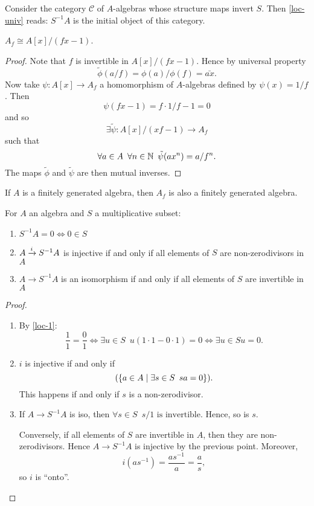 \begin{corollary}
  Consider the category $\mathcal C$ of $A$-algebras whose structure maps invert $S$. Then \cref{loc-univ} reads: $S^{-1}A$ is the initial object of this category.
\end{corollary}

\begin{lemma}
  \label{loc-1}
  $A_f \cong A[x] / {(fx-1)}$.
\end{lemma}

\begin{proof}
  Note that $f$ is invertible in $A[x] / {(fx-1)}$.
  Hence by universal property
  \[\tilde{\phi}(a / f) = \phi(a) / \phi(f) = \bar{ax}. \]
  Now take
  $\psi \colon A[x] \to A_f$ a homomorphism of $A$-algebras defined by $\psi(x) = 1 / f$.
  Then
  \[ \psi(fx - 1) = f \cdot 1 / f - 1 = 0 \]
  and so
  \[ \exists \tilde \psi \colon A[x] /{(xf-1)} \to A_f \]
  such that
  \[ \forall a \in A \enspace \forall n \in \mathbb N \enspace \tilde \psi (a x^n) = a / f^n.\]
  The maps $\tilde \phi$ and $\tilde \psi$ are then mutual inverses.
\end{proof}

\begin{corollary}
  If $A$ is a finitely generated algebra, then $A_f$ is also a finitely generated algebra.
\end{corollary}

\begin{lemma}
  For $A$ an algebra and $S$ a multiplicative subset:
  \begin{enumerate}
  \item $S^{-1}A = 0 \iff 0 \in S$
  \item $A \xrightarrow{i} S^{-1}A$ is injective if and only if all elements of $S$ are non-zerodivisors in $A$
  \item $A \to S^{-1}A$ is an isomorphism if and only if all elements of $S$ are invertible in $A$
  \end{enumerate}
\end{lemma}
\begin{proof}
  \begin{enumerate}
  \item By \cref{loc-1}:
    \[ \frac{1}{1} = \frac{0}{1} \iff \exists u \in S \enspace u(1 \cdot 1 - 0 \cdot 1 ) = 0 \iff \exists u \in S u = 0.\]
  \item $i$ is injective if and only if
    \[ (\{a \in A \mathrel{|} \exists s \in S \enspace sa = 0 \}).\]
    This happens if and only if $s$ is a non-zerodivisor.
  \item If $A \to S^{-1}A$ is iso, then $\forall s \in S \enspace s/1 \text{ is invertible}$.
    Hence, so is $s$.

    Conversely, if all elements of $S$ are invertible in $A$, then they are non-zerodivisors. Hence $A \to S^{-1}A$ is injective by the previous point.
    Moreover,
    \[i (a s^{-1}) = \frac{a s^{-1}}{a} = \frac{a}{s},\]
    so $i$ is ``onto''.
  \end{enumerate}
\end{proof}

